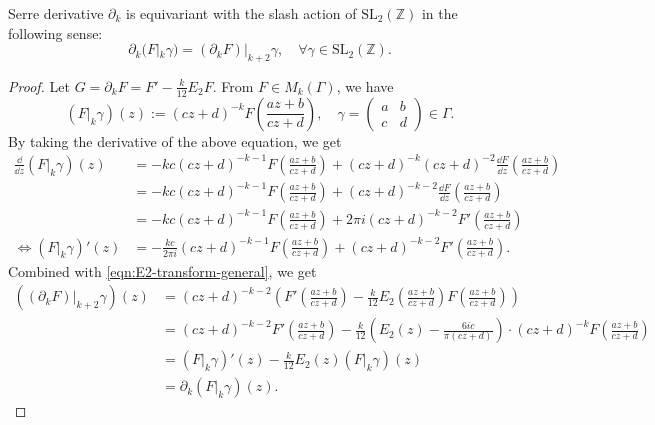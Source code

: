 \begin{theorem}
\label{thm:serre-der-equiv-action}\leanok
Serre derivative $\partial_{k}$ is equivariant with the slash action of $\mathrm{SL}_{2}(\mathbb{Z})$ in the following sense:
\begin{equation}
    \partial_{k} (F|_{k}\gamma) = (\partial_{k} F)|_{k+2}\gamma, \quad \forall \gamma \in \mathrm{SL}_{2}(\mathbb{Z}).
\end{equation}
\end{theorem}
\begin{proof}
Let $G = \partial_{k}F = F' - \frac{k}{12}E_2 F$.
From $F \in M_k(\Gamma)$, we have
\begin{equation}
    (F|_{k}\gamma)(z) := (cz + d)^{-k} F\left(\frac{az + b}{cz + d}\right), \quad \gamma = \begin{pmatrix}a & b \\ c & d\end{pmatrix} \in \Gamma.
\end{equation}
By taking the derivative of the above equation, we get
\begin{align}
    \frac{\dd}{\dd z}(F|_{k} \gamma)(z) &= -kc (cz + d)^{-k - 1} F\left(\frac{az + b}{cz + d}\right) + (cz + d)^{-k} (cz + d)^{-2} \frac{\dd F}{\dd z}\left(\frac{az + b}{cz + d}\right) \\
    &= -kc (cz + d)^{-k - 1} F\left(\frac{az + b}{cz + d}\right) + (cz + d)^{-k - 2} \frac{\dd F}{\dd z}\left(\frac{az + b}{cz + d}\right) \\
    &= -kc (cz + d)^{-k - 1} F\left(\frac{az + b}{cz + d}\right) + 2 \pi i (cz + d)^{-k - 2} F'\left(\frac{az + b}{cz + d}\right) \\
    \Leftrightarrow (F|_{k} \gamma)'(z) &= -\frac{kc}{2 \pi i} (cz + d)^{-k - 1} F\left(\frac{az + b}{cz + d}\right) + (cz + d)^{-k - 2} F'\left(\frac{az + b}{cz + d}\right).
\end{align}
Combined with \eqref{eqn:E2-transform-general}, we get
\begin{align}
    ((\partial_k F)|_{k+2}\gamma)(z) &= (cz + d)^{-k-2} \left(F'\left(\frac{az + b}{cz + d}\right) - \frac{k}{12}E_2\left(\frac{az + b}{cz + d}\right)F\left(\frac{az + b}{cz + d}\right)\right) \\
    &= (cz + d)^{-k-2} F'\left(\frac{az + b}{cz + d}\right) - \frac{k}{12} \left(E_2(z) - \frac{6ic}{\pi(cz + d)}\right) \cdot (cz + d)^{-k} F\left(\frac{az + b}{cz + d}\right) \\
    &= (F|_{k}\gamma)'(z) - \frac{k}{12} E_2(z) (F|_{k}\gamma)(z) \\
    &= \partial_{k} (F|_{k}\gamma)(z).
\end{align}
\end{proof}

